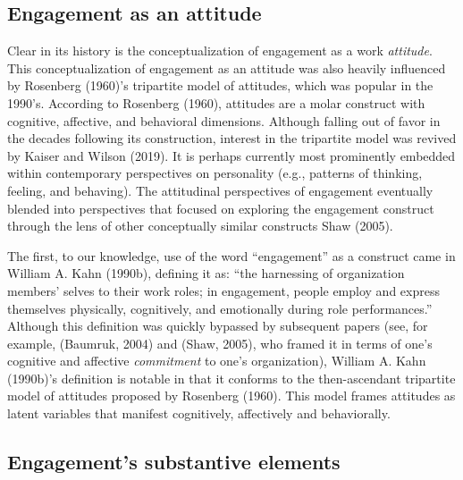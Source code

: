 \documentclass[
  man]{apa7}
\begin{document}
\hypertarget{engagement-as-an-attitude}{%
\subsection{Engagement as an attitude}\label{engagement-as-an-attitude}}

Clear in its history is the conceptualization of engagement as a work \emph{attitude}. This conceptualization of engagement as an attitude was also heavily influenced by Rosenberg (1960)'s tripartite model of attitudes, which was popular in the 1990's. According to Rosenberg (1960), attitudes are a molar construct with cognitive, affective, and behavioral dimensions. Although falling out of favor in the decades following its construction, interest in the tripartite model was revived by Kaiser and Wilson (2019). It is perhaps currently most prominently embedded within contemporary perspectives on personality (e.g., patterns of thinking, feeling, and behaving). The attitudinal perspectives of engagement eventually blended into perspectives that focused on exploring the engagement construct through the lens of other conceptually similar constructs Shaw (2005).

The first, to our knowledge, use of the word ``engagement'' as a construct came in William A. Kahn (1990b), defining it as: ``the harnessing of organization members' selves to their work roles; in engagement, people employ and express themselves physically, cognitively, and emotionally during role performances.'' Although this definition was quickly bypassed by subsequent papers (see, for example, (Baumruk, 2004) and (Shaw, 2005), who framed it in terms of one's cognitive and affective \emph{commitment} to one's organization), William A. Kahn (1990b)'s definition is notable in that it conforms to the then-ascendant tripartite model of attitudes proposed by Rosenberg (1960). This model frames attitudes as latent variables that manifest cognitively, affectively and behaviorally.

\hypertarget{engagements-substantive-elements}{%
\subsection{Engagement's substantive elements}\label{engagements-substantive-elements}}
\end{document}

